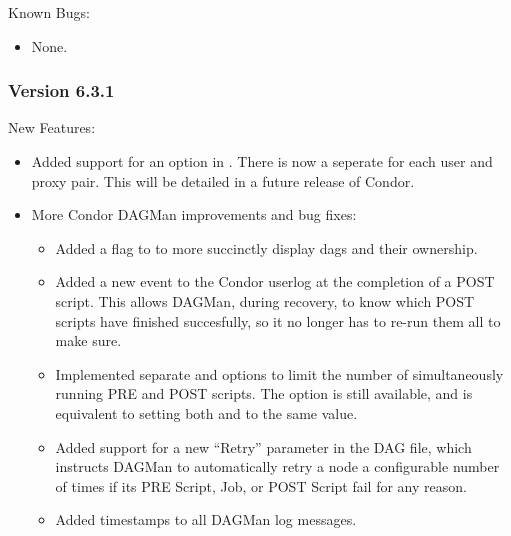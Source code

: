 \noindent Known Bugs:

\begin{itemize}

\item None.

\end{itemize}

\subsubsection{\label{sec:New-6-3-1}Version 6.3.1}

\noindent New Features:
\begin{itemize}

\item
Added support for an  option in
. There is now a seperate  for each
user and proxy pair. This will be detailed in a future release of
Condor.
 
\item
More Condor DAGMan improvements and bug fixes:

\begin{itemize}

\item 
Added a  flag to  to more succinctly display dags
and their ownership.

\item
Added a new event to the Condor userlog at the completion of a POST
script.  This allows DAGMan, during recovery, to know which POST
scripts have finished succesfully, so it no longer has to re-run them
all to make sure.

\item
Implemented separate  and  options to limit
the number of simultaneously running PRE and POST scripts.  The
 option is still available, and is equivalent to
setting both  and  to the same value.

\item
Added support for a new ``Retry'' parameter in the DAG file, which
instructs DAGMan to automatically retry a node a configurable number
of times if its PRE Script, Job, or POST Script fail for any reason.

\item
Added timestamps to all DAGMan log messages.


\end{itemize}
\end{itemize}
